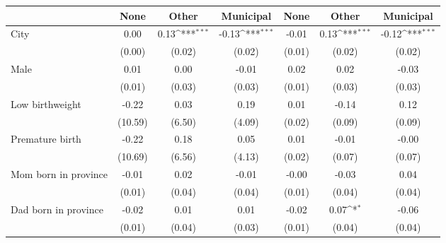 {
\def\sym#1{\ifmmode^{#1}\else\(^{#1}\)\fi}
\begin{tabular}{l*{6}{c}}
\toprule
                    &\multicolumn{1}{c}{None}&\multicolumn{1}{c}{Other}&\multicolumn{1}{c}{Municipal}&\multicolumn{1}{c}{None}&\multicolumn{1}{c}{Other}&\multicolumn{1}{c}{Municipal}\\
\midrule
City                &        0.00         &        0.13\sym{***}&       -0.13\sym{***}&       -0.01         &        0.13\sym{***}&       -0.12\sym{***}\\
                    &      (0.00)         &      (0.02)         &      (0.02)         &      (0.01)         &      (0.02)         &      (0.02)         \\
\addlinespace
Male                &        0.01         &        0.00         &       -0.01         &        0.02         &        0.02         &       -0.03         \\
                    &      (0.01)         &      (0.03)         &      (0.03)         &      (0.01)         &      (0.03)         &      (0.03)         \\
\addlinespace
Low birthweight     &       -0.22         &        0.03         &        0.19         &        0.01         &       -0.14         &        0.12         \\
                    &     (10.59)         &      (6.50)         &      (4.09)         &      (0.02)         &      (0.09)         &      (0.09)         \\
\addlinespace
Premature birth     &       -0.22         &        0.18         &        0.05         &        0.01         &       -0.01         &       -0.00         \\
                    &     (10.69)         &      (6.56)         &      (4.13)         &      (0.02)         &      (0.07)         &      (0.07)         \\
\addlinespace
Mom born in province&       -0.01         &        0.02         &       -0.01         &       -0.00         &       -0.03         &        0.04         \\
                    &      (0.01)         &      (0.04)         &      (0.04)         &      (0.01)         &      (0.04)         &      (0.04)         \\
\addlinespace
Dad born in province&       -0.02         &        0.01         &        0.01         &       -0.02         &        0.07\sym{*}  &       -0.06         \\
                    &      (0.01)         &      (0.04)         &      (0.03)         &      (0.01)         &      (0.04)         &      (0.04)         \\

\end{tabular}}
